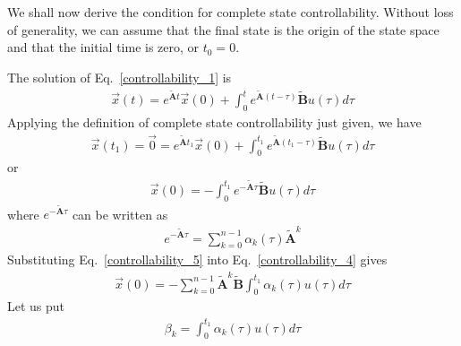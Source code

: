 \documentclass[11pt,a4paper,oneside]{book}
\numberwithin{equation}{section}
\theoremstyle{it}
\theoremstyle{definition}
\begin{document}
We shall now derive the condition for complete state controllability. Without 
loss of generality, we can assume that the final state is the origin of the 
state space and that the initial time is zero, or $t_0=0$.

The solution of Eq.~\eqref{controllability_1} is
\begin{equation}\label{controllability_2}
	\begin{aligned}
		\vec{x}(t)=e^{\tilde{\mathbf{A}}t}\vec{x}(0)+\int_{0}^{t}e^{\tilde{\mathbf{A}}
		 (t-\tau)}\tilde{\mathbf{B}}u(\tau)d\tau
	\end{aligned}
\end{equation}
Applying the definition of complete state controllability just given, we have
\begin{equation}\label{controllability_3}
	\begin{aligned}
		\vec{x}(t_1)=\vec{0}=e^{\tilde{\mathbf{A}}t_1}\vec{x}(0)+ 
		\int_{0}^{t_1}e^{\tilde{\mathbf{A}}(t_1-\tau)}\tilde{\mathbf{B}}u(\tau)d\tau
	\end{aligned}
\end{equation}
or 
\begin{equation}\label{controllability_4}
	\begin{aligned}
		\vec{x}(0)=-\int_{0}^{t_1}e^{-\tilde{\mathbf{A}}\tau} 
		\tilde{\mathbf{B}}u(\tau)d\tau
	\end{aligned}
\end{equation}
where $e^{-\tilde{\mathbf{A}}\tau}$ can be written as
\begin{equation}\label{controllability_5}
	\begin{aligned}
		e^{-\tilde{\mathbf{A}}\tau}=\sum_{k=0}^{n-1}\alpha_k(\tau)\tilde{\mathbf{A}}^k
	\end{aligned}
\end{equation}
Substituting Eq.~\eqref{controllability_5} into Eq.~\eqref{controllability_4} 
gives
\begin{equation}\label{controllability_6}
	\begin{aligned}
		\vec{x}(0)=-\sum_{k=0}^{n-1}\tilde{\mathbf{A}}^k\tilde{\mathbf{B}} 
		\int_{0}^{t_1}\alpha_k(\tau)u(\tau)d\tau
	\end{aligned}
\end{equation}
Let us put
\begin{equation}\label{controllability_7}
	\begin{aligned}
		\beta_k=\int_{0}^{t_1}\alpha_k(\tau)u(\tau)d\tau
	\end{aligned}
\end{equation}
\end{document}
